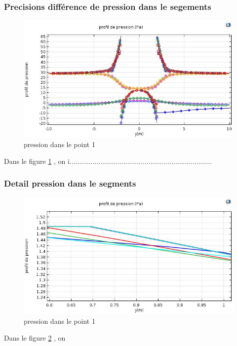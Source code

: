 \documentclass[a4paper,11pt]{report} %
\begin{document}
\subsubsection{Precisions différence de pression dans le segements}
\begin{figure}[!h]
\centering
\hspace*{0mm}\vfill
\begin{center} \includegraphics[width=1.\textwidth]{pre_pression_segment.jpg} \end{center}
\vfill\hspace*{0mm}
\caption{pression dans le point 1 }
\label{pression_ponctuel1}
\end{figure}\pagebreak
Dans le figure \ref{pression_ponctuel1} , on i..........................................................................



\subsubsection{Detail pression dans le segments}
\begin{figure}[!h]
\centering
\hspace*{0mm}\vfill
\begin{center} \includegraphics[width=1.\textwidth]{pression_seg_detail.jpg} \end{center}
\vfill\hspace*{0mm}
\caption{pression dans le point 1 }
\label{detail_pression}
\end{figure}\pagebreak
Dans le figure \ref{detail_pression} , on
\end{document}
